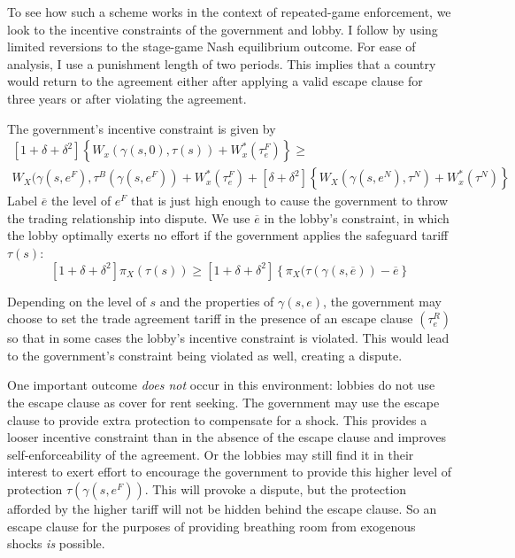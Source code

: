 \documentclass[12pt,titlepage]{article}
\newcommand{\ov}{\overline}
\newcommand{\ga}{\gamma}
\newcommand{\de}{\delta}
\begin{document}
To see how such a scheme works in the context of repeated-game enforcement, we look to the incentive constraints of the government and lobby. I follow \Textcite{buzard2013a} by using limited reversions to the stage-game Nash equilibrium outcome. For ease of analysis, I use a punishment length of two periods. This implies that a country would return to the agreement either after applying a valid escape clause for three years or after violating the agreement.

The government's incentive constraint is given by
  \begin{multline}
    \left[1+ \de +\de^2 \right] \left\{W_x(\ga(s,0),\tau(s)) + W_x^*(\tau_e^F) \right\} \geq \\ W_X(\ga(s,e^F),\tau^B(\ga(s,e^F)) + W_x^*(\tau_e^F) + \left[\de +\de^2 \right] \left\{W_X(\ga(s,e^N),\tau^N) + W_x^*(\tau^N) \right\}
		\label{exp:govincentEC}
  \end{multline}
Label $\ov{e}$ the level of $e^F$ that is just high enough to cause the government to throw the trading relationship into dispute. We use $\ov{e}$ in the lobby's constraint, in which the lobby optimally exerts no effort if the government applies the safeguard tariff $\tau(s)$:
\begin{equation}
  \left[1+ \de +\de^2 \right] \pi_X(\tau(s)) \geq \left[1+ \de +\de^2 \right] \left\{\pi_X(\tau(\ga(s,\ov{e})) - \ov{e} \right\}
	\label{exp:lobbyEC}
\end{equation}

Depending on the level of $s$ and the properties of $\ga(s,e)$, the government may choose to set the trade agreement tariff in the presence of an escape clause $\left(\tau_e^R\right)$ so that in some cases the lobby's incentive constraint is violated. This would lead to the government's constraint being violated as well, creating a dispute. 

One important outcome \textit{does not} occur in this environment: lobbies do not use the escape clause as cover for rent seeking. The government may use the escape clause to provide extra protection to compensate for a shock. This provides a looser incentive constraint than in the absence of the escape clause and improves self-enforceability of the agreement. Or the lobbies may still find it in their interest to exert effort to encourage the government to provide this higher level of protection $\tau(\ga(s,e^F))$. This will provoke a dispute, but the protection afforded by the higher tariff will not be hidden behind the escape clause. So an escape clause for the purposes of providing breathing room from exogenous shocks \textit{is} possible.
\end{document}
